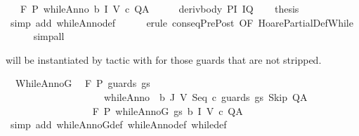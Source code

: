 \begin{isabellebody}
\ \ \ {\isachardoublequoteopen}{\isasymGamma}{\isacharcomma}{\isasymTheta}{\isasymturnstile}\isactrlbsub {\isacharslash}F\isactrlesub \ P\ {\isacharparenleft}whileAnno\ b\ I\ V\ c{\isacharparenright}\ Q{\isacharcomma}A{\isachardoublequoteclose}\isanewline
%
\isadelimproof
%
\endisadelimproof
%
\isatagproof
{}\isamarkupfalse%
\ {\isacharminus}\isanewline
\ \ \isamarkupfalse%
\ deriv{\isacharunderscore}body\ P{\isacharunderscore}I\ I{\isacharunderscore}Q\isanewline
\ \ \isamarkupfalse%
\ {\isacharquery}thesis\isanewline
\ \ \ \ \isamarkupfalse%
\ {\isacharparenleft}simp\ add{\isacharcolon}\ whileAnno{\isacharunderscore}def{\isacharparenright}\isanewline
\ \ \ \ \isamarkupfalse%
\ {\isacharparenleft}erule\ conseqPrePost\ {\isacharbrackleft}OF\ HoarePartialDef{\isachardot}While{\isacharbrackright}{\isacharparenright}\ \isanewline
\ \ \ \ \isamarkupfalse%
\ simp{\isacharunderscore}all\isanewline
\ \ \ \ \isamarkupfalse%
\isanewline
{}\isamarkupfalse%
%
\endisatagproof
{\isafoldproof}%
%
\isadelimproof
%
\endisadelimproof
%
\begin{isamarkuptext}%
 will be instantiated by tactic with  for
  those guards that are not stripped.%
\end{isamarkuptext}\isamarkuptrue%
\isamarkupfalse%
\ \ WhileAnnoG{\isacharcolon}\isanewline
\ \ {\isachardoublequoteopen}{\isasymGamma}{\isacharcomma}{\isasymTheta}{\isasymturnstile}\isactrlbsub {\isacharslash}F\isactrlesub \ P\ {\isacharparenleft}guards\ gs\ \isanewline
\ \ \ \ \ \ \ \ \ \ \ \ \ \ \ \ \ \ \ \ {\isacharparenleft}whileAnno\ \ b\ J\ V\ {\isacharparenleft}Seq\ c\ {\isacharparenleft}guards\ gs\ Skip{\isacharparenright}{\isacharparenright}{\isacharparenright}{\isacharparenright}\ Q{\isacharcomma}A\ \isanewline
\ \ \ \ \ \ \ \ {\isasymLongrightarrow}\ \isanewline
\ \ \ \ \ \ \ \ {\isasymGamma}{\isacharcomma}{\isasymTheta}{\isasymturnstile}\isactrlbsub {\isacharslash}F\isactrlesub \ P\ {\isacharparenleft}whileAnnoG\ gs\ b\ I\ V\ c{\isacharparenright}\ Q{\isacharcomma}A{\isachardoublequoteclose}\isanewline
%
\isadelimproof
\ \ %
\endisadelimproof
%
\isatagproof
{}\isamarkupfalse%
\ {\isacharparenleft}simp\ add{\isacharcolon}\ whileAnnoG{\isacharunderscore}def\ whileAnno{\isacharunderscore}def\ while{\isacharunderscore}def{\isacharparenright}%
\endisatagproof
{\isafoldproof}%
%
\isadelimproof
%
\endisadelimproof
%
\begin{isamarkuptext}%

\end{isamarkuptext}
\end{isabellebody}
